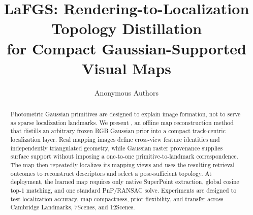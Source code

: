 \documentclass[10pt,twocolumn,letterpaper]{article}
\title{LaFGS: Rendering-to-Localization Topology Distillation\\
for Compact Gaussian-Supported Visual Maps}
\author{Anonymous Authors}
\begin{document}
\maketitle

\begin{abstract}
Photometric Gaussian primitives are designed to explain image formation, not
to serve as sparse localization landmarks. We present \method, an offline map
reconstruction method that distills an arbitrary frozen RGB Gaussian prior
into a compact track-centric localization layer. Real mapping images define
cross-view feature identities and independently triangulated geometry, while
Gaussian raster provenance supplies surface support without imposing a
one-to-one primitive-to-landmark correspondence. The map then repeatedly
localizes its mapping views and uses the resulting retrieval outcomes to
reconstruct descriptors and select a pose-sufficient topology. At deployment,
the learned map requires only native SuperPoint extraction, global cosine
top-1 matching, and one standard PnP/RANSAC solve. Experiments are designed to
test localization accuracy, map compactness, prior flexibility, and transfer
across Cambridge Landmarks, 7Scenes, and 12Scenes.
\end{abstract}









\end{document}
